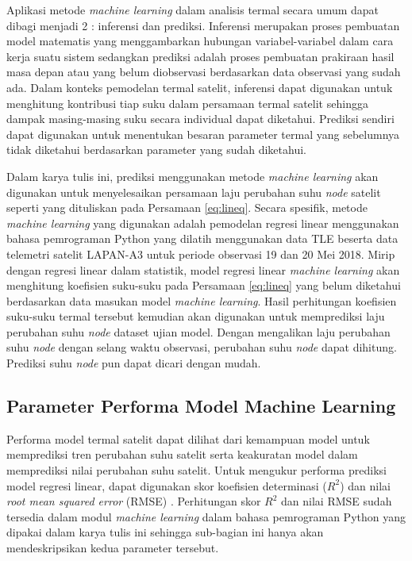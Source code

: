 Aplikasi metode \textit{machine learning} dalam analisis termal secara umum
dapat dibagi menjadi 2 : inferensi dan prediksi. Inferensi merupakan proses
pembuatan model matematis yang menggambarkan hubungan variabel-variabel dalam
cara kerja suatu sistem sedangkan prediksi adalah proses pembuatan prakiraan
hasil masa depan atau yang belum diobservasi berdasarkan data observasi yang
sudah ada. Dalam konteks pemodelan termal satelit, inferensi dapat digunakan
untuk menghitung kontribusi tiap suku dalam persamaan termal satelit sehingga
dampak masing-masing suku secara individual dapat diketahui. Prediksi sendiri
dapat digunakan untuk menentukan besaran parameter termal yang
sebelumnya tidak diketahui berdasarkan parameter yang sudah
diketahui.

Dalam karya tulis ini, prediksi menggunakan metode \textit{machine learning}
akan digunakan untuk menyelesaikan persamaan laju perubahan suhu \textit{node}
satelit seperti yang dituliskan pada Persamaan \ref{eq:lineq}. Secara spesifik,
metode \textit{machine learning} yang digunakan adalah pemodelan regresi linear
menggunakan bahasa pemrograman Python yang dilatih menggunakan data TLE beserta
data telemetri satelit LAPAN-A3 untuk periode observasi 19 dan 20 Mei 2018.
Mirip dengan regresi linear dalam statistik, model regresi linear
\textit{machine learning} akan menghitung koefisien suku-suku pada Persamaan
\ref{eq:lineq} yang belum diketahui berdasarkan data masukan model
\textit{machine learning}. Hasil perhitungan koefisien suku-suku termal
tersebut kemudian akan digunakan untuk memprediksi laju perubahan suhu \textit{node}
dataset ujian model. Dengan mengalikan laju perubahan suhu \textit{node} dengan
selang waktu observasi, perubahan suhu \textit{node} dapat dihitung. Prediksi
suhu \textit{node} pun dapat dicari dengan mudah.

\subsection{Parameter Performa Model Machine Learning}

Performa model termal satelit dapat dilihat dari kemampuan model untuk
memprediksi tren perubahan suhu satelit serta keakuratan model dalam
memprediksi nilai perubahan suhu satelit. Untuk mengukur performa prediksi
model regresi linear, dapat digunakan skor koefisien determinasi ($R^2$)
\cite{gupta2021} dan nilai \textit{root mean squared error} (RMSE)
\cite{zheng}. Perhitungan skor $R^2$ dan nilai RMSE sudah tersedia dalam modul
\textit{machine learning} dalam bahasa pemrograman Python yang dipakai dalam
karya tulis ini sehingga sub-bagian ini hanya akan mendeskripsikan kedua
parameter tersebut.

